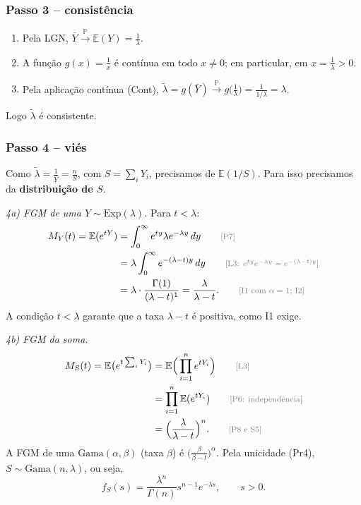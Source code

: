 \documentclass[11pt,a4paper]{article}
\theoremstyle{definition}
\theoremstyle{plain}
\newcommand{\E}{\mathbb{E}}
\newcommand{\Prob}{\mathbb{P}}
\newcommand{\convP}{\xrightarrow{\;\Prob\;}}
\newcommand{\bY}{\bar{Y}}
\newcommand{\just}[1]{\tag*{\footnotesize\textcolor{gray}{[#1]}}}
\begin{document}
\subsubsection*{Passo 3 -- consistência}
\begin{enumerate}[label=(\roman*)]
\item Pela LGN, $\bY\convP\E(Y)=\frac1\lambda$.
\item A função $g(x)=\frac1x$ é contínua em todo $x\ne0$; em particular, em $x=\frac1\lambda>0$.
\item Pela aplicação contínua (Cont), $\tilde\lambda=g(\bY)\convP g\big(\frac1\lambda\big)=\frac{1}{1/\lambda}=\lambda$.
\end{enumerate}
Logo $\tilde\lambda$ é consistente.

\subsubsection*{Passo 4 -- viés}
Como $\tilde\lambda=\frac{1}{\bY}=\frac{n}{S}$, com $S=\sum_iY_i$, precisamos de $\E(1/S)$. Para isso precisamos da \textbf{distribuição de $S$}.

\textit{4a) FGM de uma $Y\sim\text{Exp}(\lambda)$.} Para $t<\lambda$:
\begin{align*}
M_Y(t)=\E(e^{tY})&=\int_0^\infty e^{ty}\lambda e^{-\lambda y}\,dy \just{P7}\\
&=\lambda\int_0^\infty e^{-(\lambda-t)y}\,dy \just{L3: $e^{ty}e^{-\lambda y}=e^{-(\lambda-t)y}$}\\
&=\lambda\cdot\frac{\Gamma(1)}{(\lambda-t)^1}=\frac{\lambda}{\lambda-t}. \just{I1 com $\alpha=1$; I2}
\end{align*}
A condição $t<\lambda$ garante que a taxa $\lambda-t$ é positiva, como I1 exige.

\textit{4b) FGM da soma.}
\begin{align*}
M_S(t)=\E\big(e^{t\sum_iY_i}\big)&=\E\Big(\prod_{i=1}^ne^{tY_i}\Big) \just{L3}\\
&=\prod_{i=1}^n\E(e^{tY_i}) \just{P6: independência}\\
&=\Big(\frac{\lambda}{\lambda-t}\Big)^n . \just{P8 e S5}
\end{align*}
A FGM de uma $\text{Gama}(\alpha,\beta)$ (taxa $\beta$) é $\big(\frac{\beta}{\beta-t}\big)^\alpha$. Pela unicidade (Pr4), $S\sim\text{Gama}(n,\lambda)$, ou seja,
\[
f_S(s)=\frac{\lambda^n}{\Gamma(n)}s^{n-1}e^{-\lambda s},\qquad s>0 .
\]
\end{document}
